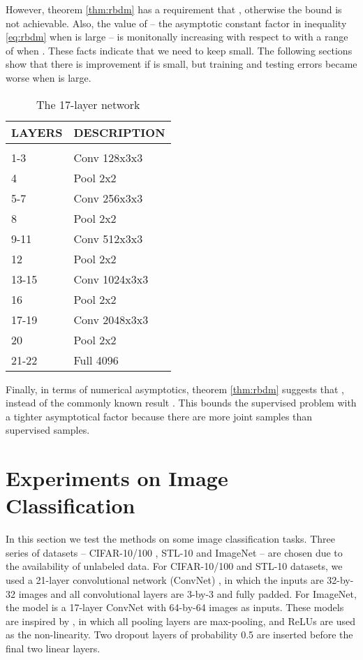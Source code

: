 \documentclass[letterpaper]{article}
\begin{document}
However, theorem \ref{thm:rbdm} has a requirement that , otherwise the bound is not achievable. Also, the value of  -- the asymptotic constant factor in inequality \ref{eq:rbdm} when  is large -- is monitonally increasing with respect to  with a range of  when . These facts indicate that we need to keep  small. The following sections show that there is improvement if  is small, but training and testing errors became worse when  is large.

\begin{table}[h]
  \caption{The 17-layer network}
  \label{tab:expn}
  \begin{center}
    \begin{tabular}{ll}
      \multicolumn{1}{c}{\bf LAYERS}  &\multicolumn{1}{c}{\bf DESCRIPTION}
      \\ \hline \\
      1-3           &Conv 128x3x3 \\
      4             &Pool 2x2 \\
      5-7           &Conv 256x3x3 \\
      8             &Pool 2x2 \\
      9-11          &Conv 512x3x3 \\
      12            &Pool 2x2 \\
      13-15         &Conv 1024x3x3 \\
      16            &Pool 2x2 \\
      17-19         &Conv 2048x3x3 \\
      20            &Pool 2x2 \\
      21-22         &Full 4096 \\
    \end{tabular}
  \end{center}
\end{table}

Finally, in terms of numerical asymptotics, theorem \ref{thm:rbdm} suggests that , instead of the commonly known result . This bounds the supervised problem with a tighter asymptotical factor because there are more joint samples than supervised samples.

\section{Experiments on Image Classification}
\label{sec:expi}

In this section we test the methods on some image classification tasks. Three series of datasets -- CIFAR-10/100 \cite{K09}, STL-10 \cite{ANL11} and ImageNet \cite{RDSKSMHKKBBF15} -- are chosen due to the availability of unlabeled data. For CIFAR-10/100 and STL-10 datasets, we used a 21-layer convolutional network (ConvNet) \cite{LBDHHHJ89} \cite{LBBH98}, in which the inputs are 32-by-32 images and all convolutional layers are 3-by-3 and fully padded. For ImageNet, the model is a 17-layer ConvNet with 64-by-64 images as inputs. These models are inspired by \cite{SZ14}, in which all pooling layers are max-pooling, and ReLUs \cite{NH10} are used as the non-linearity. Two dropout \cite{SHKSS14} layers of probability 0.5 are inserted before the final two linear layers.
\end{document}
